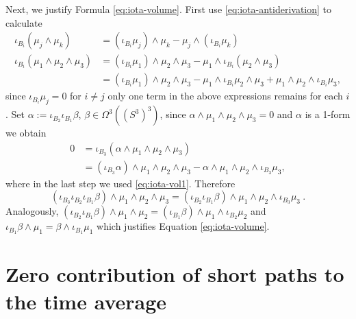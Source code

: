 \documentclass[12pt]{article}
\numberwithin{equation}{section}
\newcommand{\no}{\noindent}
\begin{document}
\no Next, we justify Formula \eqref{eq:iota-volume}. First use \eqref{eq:iota-antiderivation} to calculate
\begin{equation}\label{eq:iota-vol1}
 \begin{split}
  \iota_{B_i} (\mu_j\wedge\mu_k) & = (\iota_{B_i} \mu_j)\wedge\mu_k-\mu_j\wedge(\iota_{B_i}\mu_k)\\
  \iota_{B_i} (\mu_1\wedge\mu_2\wedge\mu_3) & = (\iota_{B_i} \mu_1)\wedge\mu_2\wedge\mu_3-\mu_1\wedge \iota_{B_i}(\mu_2\wedge\mu_3)\\
  & =(\iota_{B_i} \mu_1)\wedge\mu_2\wedge\mu_3-\mu_1\wedge \iota_{B_i}\mu_2\wedge\mu_3+\mu_1\wedge \mu_2\wedge\iota_{B_i}\mu_3,
 \end{split}
\end{equation}
since $\iota_{B_i}\mu_j=0$ for $i\neq j$ only one term in the above expressions remains for each $i$.
Set $\alpha:=\iota_{B_2}\iota_{B_1}\beta$, $\beta\in \Omega^3((S^3)^3)$, since $\alpha\wedge \mu_1\wedge\mu_2\wedge\mu_3=0$ and $\alpha$ is a 1-form we obtain
\[
\begin{split}
 0 & =\iota_{B_3}(\alpha\wedge \mu_1\wedge\mu_2\wedge\mu_3)\\
   & =(\iota_{B_3}\alpha)\wedge\mu_1\wedge\mu_2\wedge\mu_3-\alpha\wedge \mu_1\wedge\mu_2\wedge\iota_{B_3}\mu_3,
\end{split}
\]
where in the last step we used \eqref{eq:iota-vol1}. Therefore
\[
(\iota_{B_3}\iota_{B_2}\iota_{B_1}\beta)\wedge\mu_1\wedge\mu_2\wedge\mu_3=(\iota_{B_2}\iota_{B_1}\beta)\wedge \mu_1\wedge\mu_2\wedge\iota_{B_3}\mu_3\ .
\]
Analogously, $(\iota_{B_2}\iota_{B_1}\beta)\wedge \mu_1\wedge\mu_2=(\iota_{B_1}\beta)\wedge \mu_1\wedge \iota_{B_2}\mu_2$ and $\iota_{B_1}\beta\wedge \mu_1=\beta\wedge \iota_{B_1}\mu_1$ which justifies Equation \eqref{eq:iota-volume}.

\section{Zero contribution of short paths to the time average}\label{apx:B}
\end{document}
